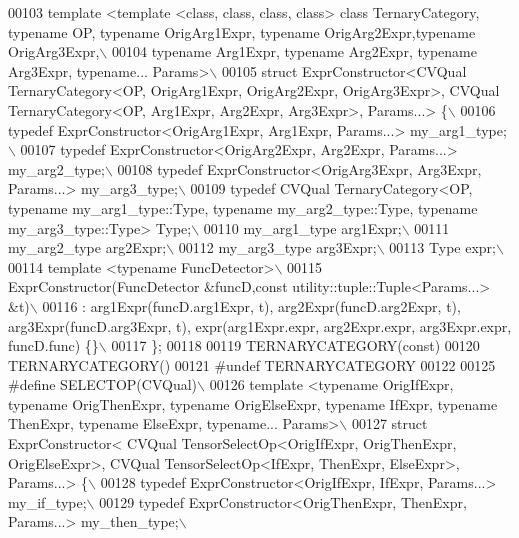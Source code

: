 \begin{DoxyCode}
00103 \textcolor{preprocessor}{template <template <class, class, class, class> class TernaryCategory, typename OP, typename OrigArg1Expr,
       typename OrigArg2Expr,typename OrigArg3Expr,\(\backslash\)}
00104 \textcolor{preprocessor}{typename Arg1Expr, typename Arg2Expr, typename Arg3Expr, typename... Params>\(\backslash\)}
00105 \textcolor{preprocessor}{struct ExprConstructor<CVQual TernaryCategory<OP, OrigArg1Expr, OrigArg2Expr, OrigArg3Expr>, CVQual
       TernaryCategory<OP, Arg1Expr, Arg2Expr, Arg3Expr>, Params...> \{\(\backslash\)}
00106 \textcolor{preprocessor}{  typedef ExprConstructor<OrigArg1Expr, Arg1Expr, Params...> my\_arg1\_type;\(\backslash\)}
00107 \textcolor{preprocessor}{  typedef ExprConstructor<OrigArg2Expr, Arg2Expr, Params...> my\_arg2\_type;\(\backslash\)}
00108 \textcolor{preprocessor}{  typedef ExprConstructor<OrigArg3Expr, Arg3Expr, Params...> my\_arg3\_type;\(\backslash\)}
00109 \textcolor{preprocessor}{  typedef  CVQual TernaryCategory<OP, typename my\_arg1\_type::Type, typename my\_arg2\_type::Type, typename
       my\_arg3\_type::Type> Type;\(\backslash\)}
00110 \textcolor{preprocessor}{  my\_arg1\_type arg1Expr;\(\backslash\)}
00111 \textcolor{preprocessor}{  my\_arg2\_type arg2Expr;\(\backslash\)}
00112 \textcolor{preprocessor}{  my\_arg3\_type arg3Expr;\(\backslash\)}
00113 \textcolor{preprocessor}{  Type expr;\(\backslash\)}
00114 \textcolor{preprocessor}{  template <typename FuncDetector>\(\backslash\)}
00115 \textcolor{preprocessor}{  ExprConstructor(FuncDetector &funcD,const utility::tuple::Tuple<Params...> &t)\(\backslash\)}
00116 \textcolor{preprocessor}{  : arg1Expr(funcD.arg1Expr, t), arg2Expr(funcD.arg2Expr, t), arg3Expr(funcD.arg3Expr, t),
       expr(arg1Expr.expr, arg2Expr.expr, arg3Expr.expr, funcD.func) \{\}\(\backslash\)}
00117 \textcolor{preprocessor}{\};}
00118 
00119 TERNARYCATEGORY(\textcolor{keyword}{const})
00120 TERNARYCATEGORY()
00121 \textcolor{preprocessor}{#undef TERNARYCATEGORY}
00122 
00125 \textcolor{preprocessor}{#define SELECTOP(CVQual)\(\backslash\)}
00126 \textcolor{preprocessor}{template <typename OrigIfExpr, typename OrigThenExpr, typename OrigElseExpr, typename IfExpr, typename
       ThenExpr, typename ElseExpr, typename... Params>\(\backslash\)}
00127 \textcolor{preprocessor}{struct ExprConstructor< CVQual TensorSelectOp<OrigIfExpr, OrigThenExpr, OrigElseExpr>, CVQual
       TensorSelectOp<IfExpr, ThenExpr, ElseExpr>, Params...> \{\(\backslash\)}
00128 \textcolor{preprocessor}{  typedef  ExprConstructor<OrigIfExpr, IfExpr, Params...> my\_if\_type;\(\backslash\)}
00129 \textcolor{preprocessor}{  typedef  ExprConstructor<OrigThenExpr, ThenExpr, Params...> my\_then\_type;\(\backslash\)}

\end{DoxyCode}
